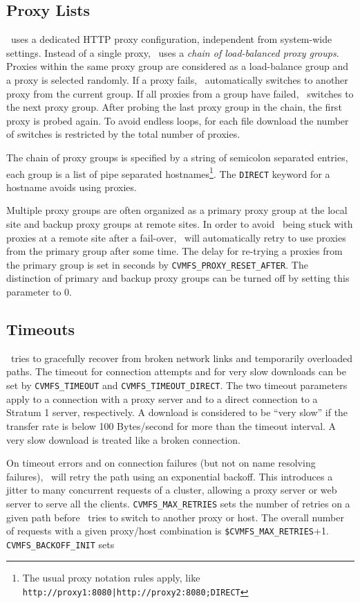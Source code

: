 \subsection{Proxy Lists}
\cvmfs\ uses a dedicated HTTP proxy configuration, independent from system-wide settings.
Instead of a single proxy, \cvmfs\ uses a \emph{chain of load-balanced proxy groups}.
Proxies within the same proxy group are considered as a load-balance group and a proxy is selected randomly.
If a proxy fails, \cvmfs\ automatically switches to another proxy from the current group.
If all proxies from a group have failed, \cvmfs\ switches to the next proxy group.
After probing the last proxy group in the chain, the first proxy is probed again.
To avoid endless loops, for each file download the number of switches is restricted by the total number of proxies.

The chain of proxy groups is specified by a string of semicolon separated entries, each group is a list of pipe separated hostnames\footnote{The usual proxy notation rules apply, like \texttt{http://proxy1:8080|http://proxy2:8080;DIRECT}}.
The \texttt{DIRECT} keyword for a hostname avoids using proxies.

Multiple proxy groups are often organized as a primary proxy group at the local site and backup proxy groups at remote sites.
In order to avoid \cvmfs\ being stuck with proxies at a remote site after a fail-over, \cvmfs\ will automatically retry to use proxies from the primary group after some time.
The delay for re-trying a proxies from the primary group is set in seconds by \texttt{CVMFS\_PROXY\_RESET\_AFTER}.
The distinction of primary and backup proxy groups can be turned off by setting this parameter to 0.

\subsection{Timeouts}
\cvmfs\ tries to gracefully recover from broken network links and temporarily overloaded paths.
The timeout for connection attempts and for very slow downloads can be set by \texttt{CVMFS\_TIMEOUT} and \texttt{CVMFS\_TIMEOUT\_DIRECT}.
The two timeout parameters apply to a connection with a proxy server and to a direct connection to a Stratum 1 server, respectively.
A download is considered to be ``very slow'' if the transfer rate is below 100 Bytes/second for more than the timeout interval.
A very slow download is treated like a broken connection.

On timeout errors and on connection failures (but not on name resolving failures), \cvmfs\ will retry the path using an exponential backoff.
This introduces a jitter to many concurrent requests of a cluster, allowing a proxy server or web server to serve all the clients.
\texttt{CVMFS\_MAX\_RETRIES} sets the number of retries on a given path before \cvmfs\ tries to switch to another proxy or host. 
The overall number of requests with a given proxy/host combination is \texttt{\$CVMFS\_MAX\_RETRIES}+1.
\texttt{CVMFS\_BACKOFF\_INIT} sets

